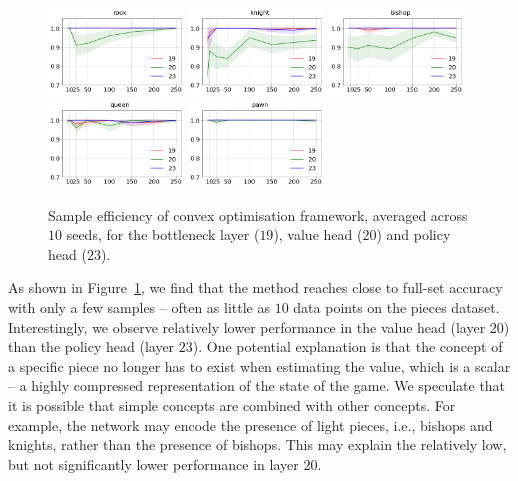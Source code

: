 \documentclass{article}
\begin{document}
\begin{figure}[ht] 
\centering
\caption{Sample efficiency of convex optimisation framework, averaged across $10$ seeds, for the bottleneck layer ($19$), value head ($20$) and policy head ($23$).}
\includegraphics[width=0.32\textwidth]{images/rook.png}
\includegraphics[width=0.32\textwidth]{images/knight.png}
\includegraphics[width=0.32\textwidth]{images/bishop.png}
\includegraphics[width=0.32\textwidth]{images/queen.png}
\includegraphics[width=0.32\textwidth]{images/pawn.png}
\label{fig:sample_efficiency}
\end{figure}

As shown in Figure~\ref{fig:sample_efficiency},
we find that the method reaches close to full-set accuracy with only a few samples -- often as little as $10$ data points on the pieces dataset. 
Interestingly, we observe relatively lower performance in the value head (layer $20$) than the policy head (layer $23$). 
One potential explanation is that the concept of a specific piece no longer has to exist when estimating the value, which is a scalar -- a highly compressed representation of the state of the game.
We speculate that it is possible that simple concepts are combined with other concepts.
For example, the network may encode the presence of light pieces, i.e., bishops and knights, rather than the presence of bishops. This may explain the relatively low, but not significantly lower performance in layer $20$. 
\end{document}
